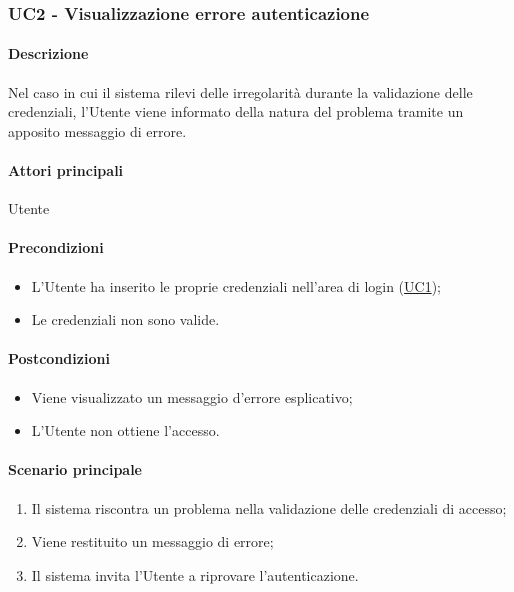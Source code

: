 \subsubsection{UC2 - Visualizzazione errore autenticazione}\label{UC2}

\paragraph*{Descrizione}
Nel caso in cui il sistema rilevi delle irregolarità durante la validazione delle credenziali, l'Utente viene informato della natura del problema tramite un apposito messaggio di errore.

\paragraph*{Attori principali}
Utente

\paragraph*{Precondizioni}
\begin{itemize}
  \item L'Utente ha inserito le proprie credenziali nell'area di login (\hyperref[UC1]{UC1});
  \item Le credenziali non sono valide.
\end{itemize}

\paragraph*{Postcondizioni}
\begin{itemize}
  \item Viene visualizzato un messaggio d'errore esplicativo;
  \item L'Utente non ottiene l'accesso.
\end{itemize}

\paragraph*{Scenario principale}
\begin{enumerate}
  \item Il sistema riscontra un problema nella validazione delle credenziali di accesso;
  \item Viene restituito un messaggio di errore;
  \item Il sistema invita l'Utente a riprovare l'autenticazione.
\end{enumerate}